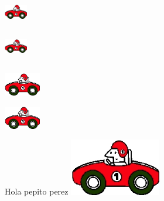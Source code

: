 \documentclass[a4paper,12pt]{article}
\begin{document}
\begin{center}
\includegraphics[width=1cm]{coche}

\includegraphics[width=1cm,height=1.5cm]{coche}

\includegraphics[height=1cm,angle=45]{coche}

\includegraphics[angle=45,height=1cm]{coche}

Hola pepito perez
\includegraphics[width=0.3\textwidth]{coche}

\end{center}
\end{document}
